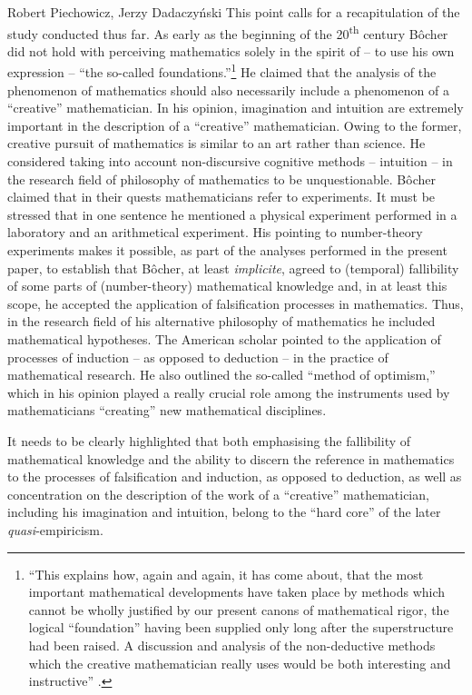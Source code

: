 \begin{artengenv}{Robert Piechowicz, Jerzy Dadaczyński}
This point calls for a recapitulation of the study conducted thus far. As early as the beginning of the 20\textsuperscript{th} century Bôcher did not hold with perceiving mathematics solely in the spirit of -- to use his own expression -- ``the so-called foundations.''\footnote{``This explains how, again and again, it has come about, that the most important mathematical developments have taken place by methods which cannot be wholly justified by our present canons of mathematical rigor, the logical ``foundation'' having been supplied only long after the superstructure had been raised. A discussion and analysis of the non-deductive methods which the creative mathematician really uses would be both interesting and instructive''
\parencite[][p.134]{bocher_fundamental_1904}.%
} He claimed that the analysis of the phenomenon of mathematics should also necessarily include a phenomenon of a ``creative'' mathematician. In his opinion, imagination and intuition are extremely important in the description of a ``creative'' mathematician. Owing to the former, creative pursuit of mathematics is similar to an art rather than science. He considered taking into account non-discursive cognitive methods -- intuition -- in the research field of philosophy of mathematics to be unquestionable. Bôcher claimed that in their quests mathematicians refer to experiments. It must be stressed that in one sentence he mentioned a physical experiment performed in a laboratory and an arithmetical experiment. His pointing to number-theory experiments makes it possible, as part of the analyses performed in the present paper, to establish that Bôcher, at least \textit{implicite}, agreed to (temporal) fallibility of some parts of (number-theory) mathematical knowledge and, in at least this scope, he accepted the application of falsification processes in mathematics. Thus, in the research field of his alternative philosophy of mathematics he included mathematical hypotheses. The American scholar pointed to the application of processes of induction -- as opposed to deduction -- in the practice of mathematical research. He also outlined the so-called ``method of optimism,'' which in his opinion played a really crucial role among the instruments used by mathematicians ``creating'' new mathematical disciplines.

It needs to be clearly highlighted that both emphasising the fallibility of mathematical knowledge and the ability to discern the reference in mathematics to the processes of falsification and induction, as opposed to deduction, as well as concentration on the description of the work of a ``creative'' mathematician, including his imagination and intuition, belong to the ``hard core'' of the later \textit{quasi}-empiricism.


\end{artengenv}
